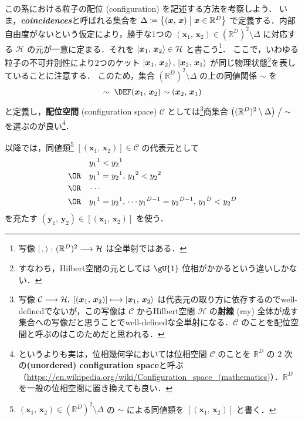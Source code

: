 \documentclass[TQFT_main]{subfiles}
\begin{document}
この系における粒子の配位 (configuration) を記述する方法を考察しよう．
いま，\textit{\textbf{coincidences}}と呼ばれる集合を
$\Delta \coloneqq \bigl\{ (\bm{x},\, \bm{x}) \bigm| \bm{x} \in \mathbb{R}^D\bigr\}$
で定義する．内部自由度がないという仮定により，勝手な1つの $(\bm{x}_1,\, \bm{x}_2) \in (\mathbb{R}^D)^2 \setminus \Delta$ に対応する $\mathcal{H}$ の元が一意に定まる．それを $\ket{\bm{x}_1,\, \bm{x}_2} \in \mathcal{H}$ と書こう\footnote{写像 $\ket{\,,\, } \colon (\mathbb{R}^D)^2 \longrightarrow \mathcal{H}$ は全単射ではある．}．
ここで，いわゆる粒子の不可弁別性により2つのケット $\ket{\bm{x}_1,\, \bm{x}_2},\, \ket{\bm{x}_2,\, \bm{x}_1}$ が同じ物理状態\footnote{すなわち，Hilbert空間の元としては $\gU{1}$ 位相がかかるという違いしかない．}を表していることに注意する．
このため，集合 $(\mathbb{R}^D)^2 \setminus \Delta$ の上の同値関係 $\sim$ を
\begin{align}
    \sim\; \DEF (\bm{x}_1,\, \bm{x}_2) \sim (\bm{x}_2,\, \bm{x}_1)
\end{align}
と定義し，\textbf{配位空間} (configuration space) $\mathcal{C}$ としては\footnote{写像 $\mathcal{C} \longrightarrow \mathcal{H},\; [(\bm{x}_1,\, \bm{x}_2)] \longmapsto \ket{\bm{x}_1,\, \bm{x}_2}$ は代表元の取り方に依存するのでwell-definedでないが，この写像は $\mathcal{C}$ からHilbert空間 $\mathcal{H}$ の\textbf{射線} (ray) 全体が成す集合への写像だと思うことでwell-definedな全単射になる．$\mathcal{C}$ のことを配位空間と呼ぶのはこのためだと思われる．}商集合 $\bigl((\mathbb{R}^D)^2 \setminus \Delta\bigr) \bigm/ {\sim}$ を選ぶのが良い\footnote{というよりも実は，位相幾何学においては位相空間 $\mathcal{C}$ のことを $\mathbb{R}^D$ の $2$ 次の\textbf{(unordered) configuration space}と呼ぶ（\url{https://en.wikipedia.org/wiki/Configuration_space_(mathematics)}）．$\mathbb{R}^D$ を一般の位相空間に置き換えても良い．}．

\begin{marker}
    以降では，同値類\footnote{$(\bm{x}_1,\, \bm{x}_2) \in (\mathbb{R}^D)^2 \setminus \Delta$ の $\sim$ による同値類を $[(\bm{x}_1,\, \bm{x}_2)]$ と書く．} $[(\bm{x}_1,\, \bm{x}_2)] \in \mathcal{C}$ の代表元として
    \begin{align}
        &y_1{}^1 < y_2{}^1 \\ 
        \OR \quad&y_1{}^1 = y_2{}^1,\, y_1{}^2 < y_2{}^2 \\
        \OR \quad&\cdots \\
        \OR \quad&y_1{}^1 = y_2{}^1,\, \cdots y_1{}^{D-1} = y_2{}^{D-1},\, y_1{}^D < y_2{}^D
    \end{align}
    を充たす $(\bm{y}_1,\, \bm{y}_2) \in [(\bm{x}_1,\, \bm{x}_2)]$ を使う．
\end{marker}
\end{document}
